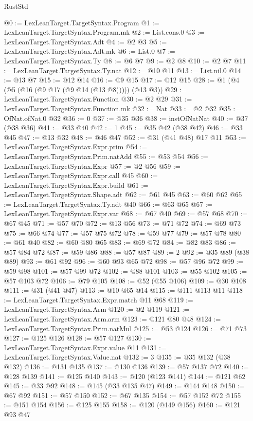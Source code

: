 \begin{lexlean}{RustStd}
\begin{coremodule}
@0 := LexLeanTarget.TargetSyntax.Program
@1 := LexLeanTarget.TargetSyntax.Program.mk
@2 := List.cons.{0}
@3 := LexLeanTarget.TargetSyntax.Adt
@4 := @2 @3
@5 := LexLeanTarget.TargetSyntax.Adt.mk
@6 := List.{0}
@7 := LexLeanTarget.TargetSyntax.Ty
@8 := @6 @7
@9 := @2 @8
@10 := @2 @7
@11 := LexLeanTarget.TargetSyntax.Ty.nat
@12 := @10 @11
@13 := List.nil.{0}
@14 := @13 @7
@15 := @12 @14
@16 := @9 @15
@17 := @12 @15
@28 := @1 (@4 (@5 (@16 (@9 @17 (@9 @14 (@13 @8))))) (@13 @3))
@29 := LexLeanTarget.TargetSyntax.Function
@30 := @2 @29
@31 := LexLeanTarget.TargetSyntax.Function.mk
@32 := Nat
@33 := @2 @32
@35 := OfNat.ofNat.{0} @32
@36 := 0
@37 := @35 @36
@38 := instOfNatNat
@40 := @37 (@38 @36)
@41 := @33 @40
@42 := 1
@45 := @35 @42 (@38 @42)
@46 := @33 @45
@47 := @13 @32
@48 := @46 @47
@52 := @31 (@41 @48) @17 @11
@53 := LexLeanTarget.TargetSyntax.Expr.prim
@54 := LexLeanTarget.TargetSyntax.Prim.natAdd
@55 := @53 @54
@56 := LexLeanTarget.TargetSyntax.Expr
@57 := @2 @56
@59 := LexLeanTarget.TargetSyntax.Expr.call @45
@60 := LexLeanTarget.TargetSyntax.Expr.build
@61 := LexLeanTarget.TargetSyntax.Shape.adt
@62 := @61 @45
@63 := @60 @62
@65 := LexLeanTarget.TargetSyntax.Ty.adt @40
@66 := @63 @65
@67 := LexLeanTarget.TargetSyntax.Expr.var
@68 := @67 @40
@69 := @57 @68
@70 := @67 @45
@71 := @57 @70
@72 := @13 @56
@73 := @71 @72
@74 := @69 @73
@75 := @66 @74
@77 := @57 @75 @72
@78 := @59 @77
@79 := @57 @78
@80 := @61 @40
@82 := @60 @80 @65
@83 := @69 @72
@84 := @82 @83
@86 := @57 @84 @72
@87 := @59 @86
@88 := @57 @87
@89 := 2
@92 := @35 @89 (@38 @89)
@93 := @61 @92
@96 := @60 @93 @65 @72
@98 := @57 @96 @72
@99 := @59 @98
@101 := @57 @99 @72
@102 := @88 @101
@103 := @55 @102
@105 := @57 @103 @72
@106 := @79 @105
@108 := @52 (@55 @106)
@109 := @30 @108
@111 := @31 (@41 @47)
@113 := @10 @65 @14
@115 := @111 @113 @11
@118 := LexLeanTarget.TargetSyntax.Expr.match @11 @68
@119 := LexLeanTarget.TargetSyntax.Arm
@120 := @2 @119
@121 := LexLeanTarget.TargetSyntax.Arm.arm
@123 := @121 @80 @48
@124 := LexLeanTarget.TargetSyntax.Prim.natMul
@125 := @53 @124
@126 := @71 @73
@127 := @125 @126
@128 := @57 @127
@130 := LexLeanTarget.TargetSyntax.Expr.value @11
@131 := LexLeanTarget.TargetSyntax.Value.nat
@132 := 3
@135 := @35 @132 (@38 @132)
@136 := @131 @135
@137 := @130 @136
@139 := @57 @137 @72
@140 := @128 @139
@141 := @125 @140
@143 := @120 (@123 @141)
@144 := @121 @62
@145 := @33 @92
@148 := @145 (@33 @135 @47)
@149 := @144 @148
@150 := @67 @92
@151 := @57 @150
@152 := @67 @135
@154 := @57 @152 @72
@155 := @151 @154
@156 := @125 @155
@158 := @120 (@149 @156)
@160 := @121 @93 @47

\end{coremodule}
\end{lexlean}
